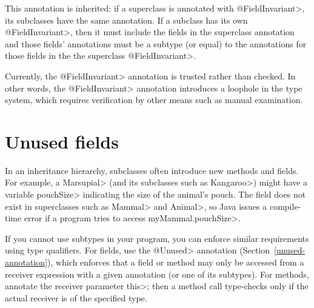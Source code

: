 This annotation is inherited:  if a superclass is annotated with
\<@FieldInvariant>, its subclasses have the same annotation. If a subclass has its
own \<@FieldInvariant>, then it must include the fields in the superclass
annotation and those fields' annotations must be a subtype (or equal) to the
annotations for those fields in the the superclass \<@FieldInvariant>.

Currently, the \<@FieldInvariant> annotation is trusted rather than
checked.  In other words, the \<@FieldInvariant> annotation introduces a
loophole in the type system, which requires verification by other means
such as manual examination.


\section{Unused fields\label{unused-fields}}

In an inheritance hierarchy, subclasses often introduce new methods and
fields.  For example, a \<Marsupial> (and its subclasses such as
\<Kangaroo>) might have a variable \<pouchSize> indicating the size of the animal's
pouch.  The field does not exist in superclasses such as
\<Mammal> and \<Animal>, so Java issues a compile-time
error if a program tries to access \<myMammal.pouchSize>.

If you cannot use subtypes in your program, you can enforce similar
requirements using type qualifiers.
For fields, use the \<@Unused> annotation (Section~\ref{unused-annotation}), which enforces that a field or method may only
be accessed from a receiver expression with a given annotation (or one of
its subtypes).
For methods, annotate the receiver parameter \<this>; then a method call
type-checks only if the actual receiver is of the specified type.





